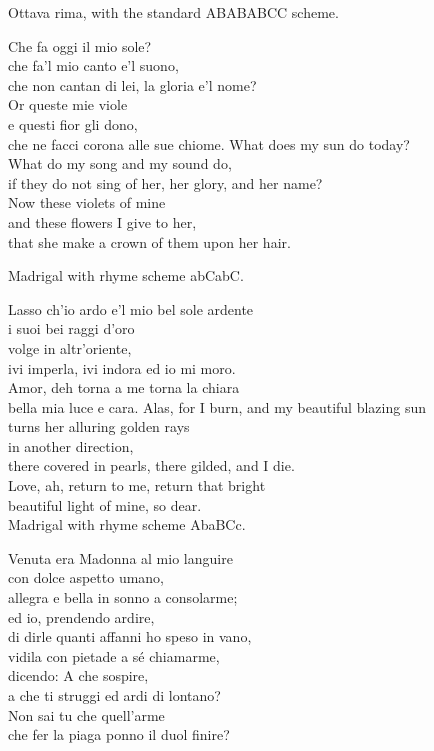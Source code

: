 \documentclass[12pt, twocolumn]{text-translation}
\begin{document}
Ottava rima, with the standard ABABABCC scheme.

Che fa oggi il mio sole? \\
che fa'l mio canto e'l suono, \\
che non cantan di lei, la gloria e'l nome? \\
Or queste mie viole \\
e questi fior gli dono,  \\
che ne facci corona alle sue chiome. 
\poemasterisks
What does my sun do today? \\
What do my song and my sound do, \\
if they do not sing of her, her glory, and her name? \\
Now these violets of mine \\
and these flowers I give to her, \\
that she make a crown of them upon her hair.

Madrigal with rhyme scheme abCabC.

Lasso ch'io ardo e'l mio bel sole ardente  \\
i suoi bei raggi d'oro  \\
volge in altr'oriente,  \\
ivi imperla, ivi indora ed io mi moro.   \\
Amor, deh torna a me torna la chiara  \\
bella mia luce e cara. 
\poemasterisks
Alas, for I burn, and my beautiful blazing sun  \\
turns her alluring golden rays  \\
in another direction,  \\
there covered in pearls, there gilded, and I die.  \\
Love, ah, return to me, return that bright  \\
beautiful light of mine, so dear.  \\

Madrigal with rhyme scheme AbaBCc.

Venuta era Madonna al mio languire  \\
con dolce aspetto umano, \\
allegra e bella in sonno a consolarme; \\
ed io, prendendo ardire, \\
di dirle quanti affanni ho speso in vano, \\
vidila con pietade a sé chiamarme,  \\
dicendo: A che sospire,  \\
a che ti struggi ed ardi di lontano? \\
Non sai tu che quell'arme \\
che fer la piaga ponno il duol finire?
\end{document}
